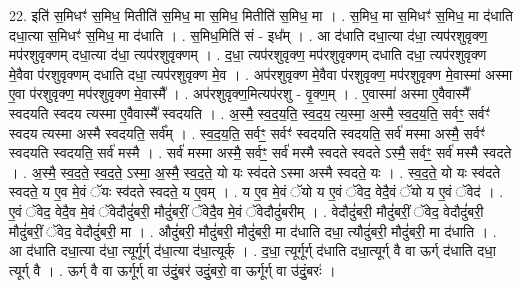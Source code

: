 \documentclass[17pt]{extarticle}
\begin{document}
22. इति॑ स॒मिधꣳ॑ स॒मिध॒ मितीति॑ स॒मिध॒ मा स॒मिध॒ मितीति॑ स॒मिध॒ मा । . स॒मिध॒ मा स॒मिधꣳ॑ स॒मिध॒ मा द॑धाति दधा॒त्या स॒मिधꣳ॑ स॒मिध॒ मा द॑धाति । . स॒मिध॒मिति॑ सं - इध᳚म् । . आ द॑धाति दधा॒त्या द॑धा॒ त्यप॑रशुवृक्ण॒ मप॑रशुवृक्णम् दधा॒त्या द॑धा॒ त्यप॑रशुवृक्णम् । . द॒धा॒ त्यप॑रशुवृक्ण॒ मप॑रशुवृक्णम् दधाति दधा॒ त्यप॑रशुवृक्ण मे॒वैवा प॑रशुवृक्णम् दधाति दधा॒ त्यप॑रशुवृक्ण मे॒व । . अप॑रशुवृक्ण मे॒वैवा प॑रशुवृक्ण॒ मप॑रशुवृक्ण मे॒वास्मा॑ अस्मा ए॒वा प॑रशुवृक्ण॒ मप॑रशुवृक्ण मे॒वास्मै᳚ । . अप॑रशुवृक्ण॒मित्यप॑रशु - वृ॒क्ण॒म् । . ए॒वास्मा॑ अस्मा ए॒वैवास्मै᳚ स्वदयति स्वदय त्यस्मा ए॒वैवास्मै᳚ स्वदयति । . अ॒स्मै॒ स्व॒द॒य॒ति॒ स्व॒द॒य॒ त्य॒स्मा॒ अ॒स्मै॒ स्व॒द॒य॒ति॒ सर्वꣳ॒॒ सर्वꣳ॑ स्वदय त्यस्मा अस्मै स्वदयति॒ सर्व᳚म् । . स्व॒द॒य॒ति॒ सर्वꣳ॒॒ सर्वꣳ॑ स्वदयति स्वदयति॒ सर्व॑ मस्मा अस्मै॒ सर्वꣳ॑ स्वदयति स्वदयति॒ सर्व॑ मस्मै । . सर्व॑ मस्मा अस्मै॒ सर्वꣳ॒॒ सर्व॑ मस्मै स्वदते स्वदते ऽस्मै॒ सर्वꣳ॒॒ सर्व॑ मस्मै स्वदते । . अ॒स्मै॒ स्व॒द॒ते॒ स्व॒द॒ते॒ ऽस्मा॒ अ॒स्मै॒ स्व॒द॒ते॒ यो यः स्व॑दते ऽस्मा अस्मै स्वदते॒ यः । . स्व॒द॒ते॒ यो यः स्व॑दते स्वदते॒ य ए॒व मे॒वं ॅयः स्व॑दते स्वदते॒ य ए॒वम् । . य ए॒व मे॒वं ॅयो य ए॒वं ॅवेद॒ वेदै॒वं ॅयो य ए॒वं ॅवेद॑ । . ए॒वं ॅवेद॒ वेदै॒व मे॒वं ॅवेदौदुं॑बरी॒ मौदुं॑बरीं॒ ॅवेदै॒व मे॒वं ॅवेदौदुं॑बरीम् । . वेदौदुं॑बरी॒ मौदुं॑बरीं॒ ॅवेद॒ वेदौदुं॑बरी॒ मौदुं॑बरीं॒ ॅवेद॒ वेदौदुं॑बरी॒ मा । . औदुं॑बरी॒ मौदुं॑बरी॒ मौदुं॑बरी॒ मा द॑धाति दधा॒ त्यौदुं॑बरी॒ मौदुं॑बरी॒ मा द॑धाति । . आ द॑धाति दधा॒त्या द॑धा॒ त्यूर्गूर्ग् द॑धा॒त्या द॑धा॒त्यूर्क् । . द॒धा॒ त्यूर्गूर्ग् द॑धाति दधा॒त्यूर्ग् वै वा ऊर्ग् द॑धाति दधा॒ त्यूर्ग् वै । . ऊर्ग् वै वा ऊर्गूर्ग् वा उ॑दुं॒बर॑ उदुं॒बरो॒ वा ऊर्गूर्ग् वा उ॑दुं॒बरः॑ । \newline
\end{document}
